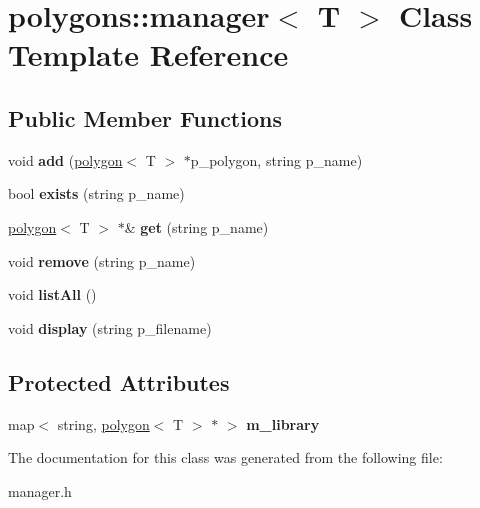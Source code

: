 \hypertarget{classpolygons_1_1manager}{\section{polygons\-:\-:manager$<$ T $>$ Class Template Reference}
\label{classpolygons_1_1manager}
}
\subsection*{Public Member Functions}
\begin{DoxyCompactItemize}
\item 
\hypertarget{classpolygons_1_1manager_a78d63452e32a64e5796b51a08f5b2b68}{void {\bfseries add} (\hyperlink{classpolygons_1_1polygon}{polygon}$<$ T $>$ $\ast$p\-\_\-polygon, string p\-\_\-name)}\label{classpolygons_1_1manager_a78d63452e32a64e5796b51a08f5b2b68}

\item 
\hypertarget{classpolygons_1_1manager_ac1f2398e33cc6ca111edd542fce62f70}{bool {\bfseries exists} (string p\-\_\-name)}\label{classpolygons_1_1manager_ac1f2398e33cc6ca111edd542fce62f70}

\item 
\hypertarget{classpolygons_1_1manager_ae9ed98c7b184436a64ba8a3c837023af}{\hyperlink{classpolygons_1_1polygon}{polygon}$<$ T $>$ $\ast$\& {\bfseries get} (string p\-\_\-name)}\label{classpolygons_1_1manager_ae9ed98c7b184436a64ba8a3c837023af}

\item 
\hypertarget{classpolygons_1_1manager_a0f18da8804c0314a8b7be0737324b14b}{void {\bfseries remove} (string p\-\_\-name)}\label{classpolygons_1_1manager_a0f18da8804c0314a8b7be0737324b14b}

\item 
\hypertarget{classpolygons_1_1manager_a36fb469747b78c08c02e762b7a97e7fb}{void {\bfseries list\-All} ()}\label{classpolygons_1_1manager_a36fb469747b78c08c02e762b7a97e7fb}

\item 
\hypertarget{classpolygons_1_1manager_a9eb125d146b0918f6be7a9906a12f5f6}{void {\bfseries display} (string p\-\_\-filename)}\label{classpolygons_1_1manager_a9eb125d146b0918f6be7a9906a12f5f6}

\end{DoxyCompactItemize}
\subsection*{Protected Attributes}
\begin{DoxyCompactItemize}
\item 
\hypertarget{classpolygons_1_1manager_a4c56d352b76872309478d426ea415d25}{map$<$ string, \hyperlink{classpolygons_1_1polygon}{polygon}$<$ T $>$ $\ast$ $>$ {\bfseries m\-\_\-library}}\label{classpolygons_1_1manager_a4c56d352b76872309478d426ea415d25}

\end{DoxyCompactItemize}


The documentation for this class was generated from the following file\-:\begin{DoxyCompactItemize}
\item 
manager.\-h\end{DoxyCompactItemize}
